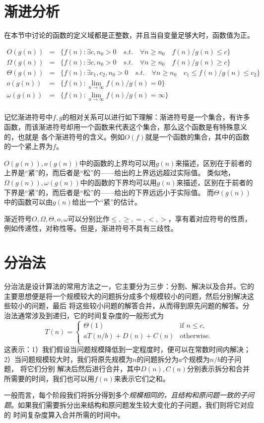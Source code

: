 \section{渐进分析}
在本节中讨论的函数的定义域都是正整数，并且当自变量足够大时，函数值为正。
\begin{mydef}[渐进符号]
    \[
    \begin{array}{rcl}
     O(g(n))&=&\{f(n):\exists c,n_0>0\quad s.t.\quad\forall n\geq n_0\quad f(n)/g(n)\leq c\}\\
    \Omega(g(n))&=&\{f(n):\exists c,n_0>0\quad s.t.\quad\forall n\geq n_0\quad f(n)/g(n)\geq c\}\\
    \Theta(g(n))&=&\{f(n):\exists c_1,c_2,n_0>0\quad s.t.\quad\forall n\geq n_0\quad c_1\leq f(n)/g(n)\leq c_2\}\\
    o(g(n))&=&\{f(n):\lim_{n\rightarrow\infty}f(n)/g(n)=0\}\\
    \omega(g(n))&=&\{f(n):\lim_{n\rightarrow\infty}f(n)/g(n)=\infty\}\\
    \end{array}
    \]
\end{mydef}
\begin{myrmk}
    记忆渐进符号中$f,g$的相对关系可以进行如下理解：渐进符号是一个集合，有许多函数，而该渐进符号却用一个函数来代表这个集合，那么这个函数是有特殊意义的，也就是
    各个渐进符号的含义。例如$O(f)$就是一个函数的集合，其中的函数的一个紧上界为$f$。
\end{myrmk}
$O(g(n)),o(g(n))$中的函数的上界均可以用$g(n)$来描述，区别在于前者的上界是“紧”的，而后者是“松”的——给出的上界远远超过实际值。
类似地，
$\Omega(g(n)),\omega(g(n))$中的函数的下界均可以用$g(n)$来描述，区别在于前者的下界是“紧”的，而后者是“松”的——给出的下界远远小于实际值。
而$\Theta(g(n))$中的函数可以由$g(n)$给出一个“紧”的估计。

渐近符号$O,\Omega,\Theta,o,\omega$可以分别比作$\leq,\geq,=,<,>$，享有着对应符号的性质，例如传递性，对称性等。但是，渐进符号不具有三歧性。
\section{分治法}
分治法是设计算法的常用方法之一，它主要分为三步：分割、解决以及合并。它的主要思想便是将一个规模较大的问题拆分成多个规模较小的问题，然后分别解决这些较小的问题，最后
将这些较小问题的解答合并，从而得到原先问题的解答。分治法通常涉及到递归，它的时间复杂度的一般形式为
\[T(n)=\begin{cases}
    \Theta(1)&\text{if }n\leq c,\\
    aT(n/b)+D(n)+C(n)&\text{otherwise.}\\
\end{cases}\]
这表示：1）我们假设当问题规模降低到一定程度时，便可以在常数时间内解决；2）当问题规模较大时，我们将原先规模为$n$的问题拆分为$a$个规模为$n/b$的子问题， 将它们分别
解决后然后进行合并，其中$D(n),C(n)$分别表示拆分和合并所需要的时间，我们也可以用$f(n)$来表示它们之和。
\begin{myrmk}
    一般而言，每个阶段我们将拆分得到多个\emph{规模相同的，且结构和原问题一致的子问题}。如果我们需要拆分出来结构和原问题发生较大变化的子问题，我们则将它对应的
    时间复杂度算入合并所需的时间中。
\end{myrmk}


